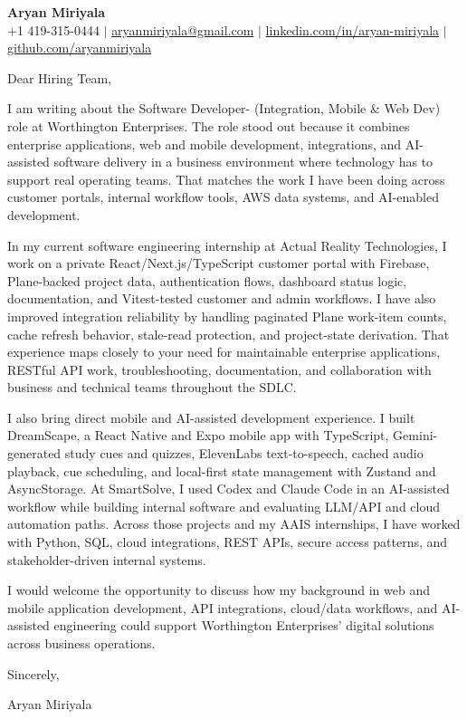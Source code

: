 \documentclass[letterpaper,11pt]{article}
\begin{document}
\begin{center}
  {\Large \textbf{Aryan Miriyala}}\\[-1pt]
  \small
  +1 419-315-0444 $|$
  \href{mailto:aryanmiriyala@gmail.com}{aryanmiriyala@gmail.com} $|$
  \href{https://www.linkedin.com/in/aryan-miriyala-7788a21b6/}{linkedin.com/in/aryan-miriyala} $|$
  \href{https://github.com/aryanmiriyala}{github.com/aryanmiriyala}
\end{center}

\vspace{8pt}

Dear Hiring Team,

I am writing about the Software Developer- (Integration, Mobile \& Web Dev) role at Worthington Enterprises. The role stood out because it combines enterprise applications, web and mobile development, integrations, and AI-assisted software delivery in a business environment where technology has to support real operating teams. That matches the work I have been doing across customer portals, internal workflow tools, AWS data systems, and AI-enabled development.

In my current software engineering internship at Actual Reality Technologies, I work on a private React/Next.js/TypeScript customer portal with Firebase, Plane-backed project data, authentication flows, dashboard status logic, documentation, and Vitest-tested customer and admin workflows. I have also improved integration reliability by handling paginated Plane work-item counts, cache refresh behavior, stale-read protection, and project-state derivation. That experience maps closely to your need for maintainable enterprise applications, RESTful API work, troubleshooting, documentation, and collaboration with business and technical teams throughout the SDLC.

I also bring direct mobile and AI-assisted development experience. I built DreamScape, a React Native and Expo mobile app with TypeScript, Gemini-generated study cues and quizzes, ElevenLabs text-to-speech, cached audio playback, cue scheduling, and local-first state management with Zustand and AsyncStorage. At SmartSolve, I used Codex and Claude Code in an AI-assisted workflow while building internal software and evaluating LLM/API and cloud automation paths. Across those projects and my AAIS internships, I have worked with Python, SQL, cloud integrations, REST APIs, secure access patterns, and stakeholder-driven internal systems.

I would welcome the opportunity to discuss how my background in web and mobile application development, API integrations, cloud/data workflows, and AI-assisted engineering could support Worthington Enterprises' digital solutions across business operations.

Sincerely,

Aryan Miriyala
\end{document}
